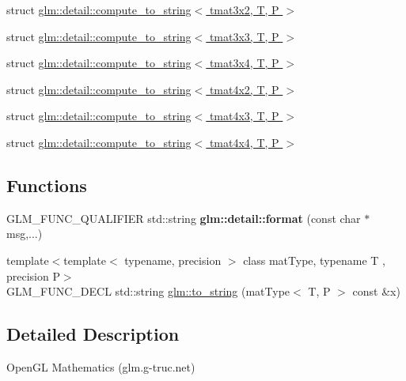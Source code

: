 \begin{DoxyCompactItemize}
\item 
struct \hyperlink{structglm_1_1detail_1_1compute__to__string_3_01tmat3x2_00_01T_00_01P_01_4}{glm\-::detail\-::compute\-\_\-to\-\_\-string$<$ tmat3x2, T, P $>$}
\item 
struct \hyperlink{structglm_1_1detail_1_1compute__to__string_3_01tmat3x3_00_01T_00_01P_01_4}{glm\-::detail\-::compute\-\_\-to\-\_\-string$<$ tmat3x3, T, P $>$}
\item 
struct \hyperlink{structglm_1_1detail_1_1compute__to__string_3_01tmat3x4_00_01T_00_01P_01_4}{glm\-::detail\-::compute\-\_\-to\-\_\-string$<$ tmat3x4, T, P $>$}
\item 
struct \hyperlink{structglm_1_1detail_1_1compute__to__string_3_01tmat4x2_00_01T_00_01P_01_4}{glm\-::detail\-::compute\-\_\-to\-\_\-string$<$ tmat4x2, T, P $>$}
\item 
struct \hyperlink{structglm_1_1detail_1_1compute__to__string_3_01tmat4x3_00_01T_00_01P_01_4}{glm\-::detail\-::compute\-\_\-to\-\_\-string$<$ tmat4x3, T, P $>$}
\item 
struct \hyperlink{structglm_1_1detail_1_1compute__to__string_3_01tmat4x4_00_01T_00_01P_01_4}{glm\-::detail\-::compute\-\_\-to\-\_\-string$<$ tmat4x4, T, P $>$}
\end{DoxyCompactItemize}
\subsection*{Functions}
\begin{DoxyCompactItemize}
\item 
\hypertarget{namespaceglm_1_1detail_acd5305bbd1c5417b1eb770faf8229d14}{G\-L\-M\-\_\-\-F\-U\-N\-C\-\_\-\-Q\-U\-A\-L\-I\-F\-I\-E\-R std\-::string {\bfseries glm\-::detail\-::format} (const char $\ast$msg,...)}\label{namespaceglm_1_1detail_acd5305bbd1c5417b1eb770faf8229d14}

\item 
{\footnotesize template$<$template$<$ typename, precision $>$ class mat\-Type, typename T , precision P$>$ }\\G\-L\-M\-\_\-\-F\-U\-N\-C\-\_\-\-D\-E\-C\-L std\-::string \hyperlink{group__gtx__string__cast_ga7b4f9233593bbf1d53762f801ef56fe6}{glm\-::to\-\_\-string} (mat\-Type$<$ T, P $>$ const \&x)
\end{DoxyCompactItemize}


\subsection{Detailed Description}
Open\-G\-L Mathematics (glm.\-g-\/truc.\-net)

